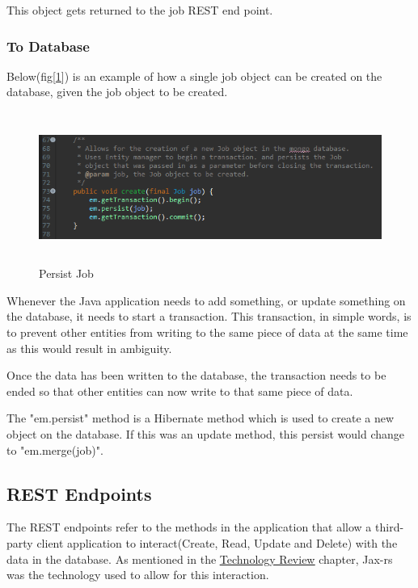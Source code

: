 This object gets returned to the job REST end point.

\subsubsection{To Database}
\label{sec:SystemDesignToDatabase}
Below(fig[\ref{fig:create}]) is an example of how a single job object can be created on the database, given the job object to be created.

\begin{figure}[H]
    \centering
    \includegraphics[width=\textwidth, height=140pt]{DesignImages/JobPutData.PNG}
    \caption{Persist Job}
    \label{fig:create}
\end{figure}

\bigskip

Whenever the Java application needs to add something, or update something on the database, it needs to start a transaction. This transaction, in simple words, is to prevent other entities from writing to the same piece of data at the same time as this would result in ambiguity.  

Once the data has been written to the database, the transaction needs to be ended so that other entities can now write to that same piece of data. 

\bigskip

The "em.persist" method is a Hibernate method which is used to create a new object on the database. If this was an update method, this persist would change to "em.merge(job)".
\subsection{REST Endpoints}
\label{sec:SystemDesignEndPoints}

The REST endpoints refer to the methods in the application that allow a third-party client application to interact(Create, Read, Update and Delete) with the data in the database. As mentioned in the \hyperref[sec:TechnologyReviewJax]{\underline{Technology Review}} chapter, Jax-rs was the technology used to allow for this interaction. 


